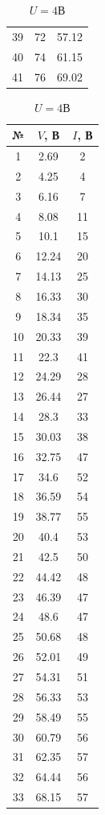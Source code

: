\documentclass[a4paper, 12pt]{article}
\begin{document}
\begin{table}[!htb]
\begin{tabular}{|c|c|c|}
 			 39 & 72 & 57.12 \\
 			 40 & 74 & 61.15 \\
 			 41 & 76 & 69.02 \\
 			\hline
			\end{tabular}
			\caption{$U=4$В}
		\endminipage\hfill
			\begin{tabular}{|c|c|c|}
			\hline
			№ & $V$, В & $I$, В\\
			\hline
			1 & 2.69 & 2 \\
 			2 & 4.25 & 4 \\
 			3 & 6.16 & 7 \\
 			4 & 8.08 & 11 \\
 			5 & 10.1 & 15 \\
 			6 & 12.24 & 20 \\
 			7 & 14.13 & 25 \\
 			8 & 16.33 & 30 \\
 			9 & 18.34 & 35 \\
 			10 & 20.33 & 39 \\
 			11 & 22.3 & 41 \\
 			12 & 24.29 & 28 \\
 			13 & 26.44 & 27 \\
 			14 & 28.3 & 33 \\
 			15 & 30.03 & 38 \\
 			16 & 32.75 & 47 \\
 			17 & 34.6 & 52 \\
 			18 & 36.59 & 54 \\
 			19 & 38.77 & 55 \\
 			20 & 40.4 & 53 \\
 			21 & 42.5 & 50 \\
 			22 & 44.42 & 48 \\
 			23 & 46.39 & 47 \\
 			24 & 48.6 & 47 \\
 			25 & 50.68 & 48 \\
 			26 & 52.01 & 49 \\
 			27 & 54.31 & 51 \\
 			28 & 56.33 & 53 \\
 			29 & 58.49 & 55 \\
 			30 & 60.79 & 56 \\
 			31 & 62.35 & 57 \\
 			32 & 64.44 & 56 \\
 			33 & 68.15 & 57 \\
			\hline
			\end{tabular}

\end{table}
\end{document}
